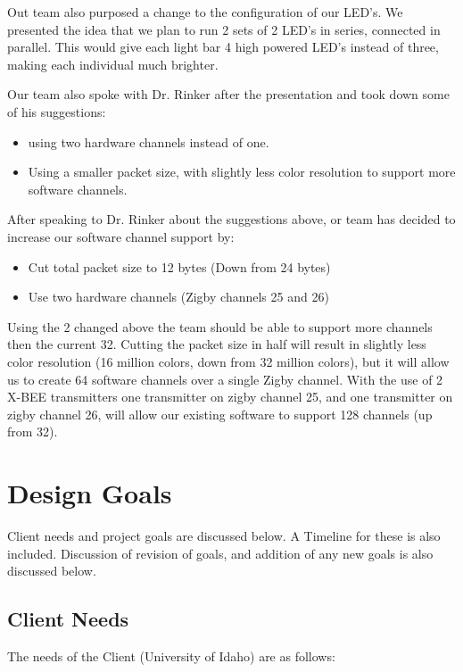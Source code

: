 \documentclass[12pt]{article}
\begin{document}
{{	\noindent
	Out team also purposed a change to the configuration of our LED's. We presented 		the idea that we plan to run 2 sets of 2 LED's in series, connected in parallel. 		This would give each light bar 4 high powered LED's instead of three, making each 	individual much brighter.
	
	\noindent
	Our team also spoke with Dr. Rinker after the presentation and took down some of 		his suggestions:
	\begin{itemize}
	\item using two hardware channels instead of one.
	\item Using a smaller packet size, with slightly less color resolution to support 	more software channels.
	\end{itemize}
	
	\noindent
	After speaking to Dr. Rinker about the suggestions above, or team has decided to 		increase our software channel support by:
	\begin{itemize}
	\item Cut total packet size to 12 bytes (Down from 24 bytes)
	\item Use two hardware channels (Zigby channels 25 and 26)
	\end{itemize}
	
	\noindent
	Using the 2 changed above the team should be able to support more channels then 		the current 32. Cutting the packet size in half will result in slightly less 			color resolution (16 million colors, down from 32 million colors), but it will 			allow us to create 64 software channels over a single Zigby channel. With the use 	of 2 X-BEE transmitters one transmitter on zigby channel 25, and one transmitter 		on zigby channel 26, will allow our existing software to support 128 channels (up 	from 32).
	
	\clearpage
	
\section{Design Goals}
	Client needs and project goals are discussed below. A Timeline for these is also included. Discussion of revision of goals, and addition of any new goals is also discussed below.
	
	\subsection{Client Needs}
	The needs of the Client (University of Idaho) are as follows:
		
}}
\end{document}
